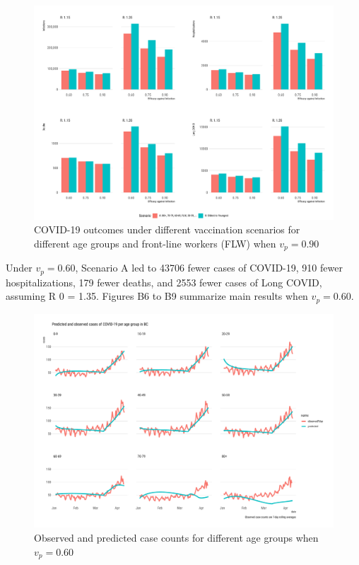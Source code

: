 \documentclass[]{elsarticle} %
\begin{document}
\begin{figure}[htb]
\begin{center}
\includegraphics[width=6in]{"../figures/vp0.90/fig-barplots.pdf"}
\caption{COVID-19 outcomes under different vaccination scenarios for different age groups and front-line workers (FLW) when $v_p=0.90$}
\end{center}
\end{figure}

Under \(v_p=0.60\), Scenario A led to 43706 fewer cases of COVID-19, 910
fewer hospitalizations, 179 fewer deaths, and 2553 fewer cases of Long
COVID, assuming R 0 = 1.35. Figures B6 to B9 summarize main results when
\(v_p=0.60\).

\begin{figure}[htb]
\begin{center}
\includegraphics[width=6in]{"../figures/vp0.60/fig-validation.pdf"}
\caption{Observed and predicted case counts for different age groups when $v_p=0.60$}
\end{center}
\end{figure}
\end{document}
